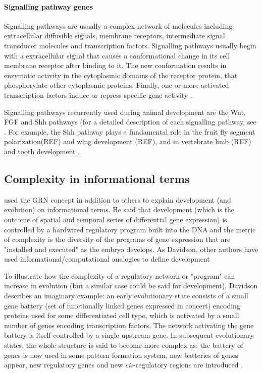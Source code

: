 \paragraph{Signalling pathway genes} Signalling pathways are usually a complex network of molecules including extracellular diffusible signals, membrane receptors, intermediate signal transducer molecules and transcription factors.
Signalling pathways usually begin with a extracellular signal that causes a conformational change in its cell membrane receptor after binding to it.
The new conformation results in enzymatic activity in the cytoplasmic domains of the receptor protein, that phosphorylate other cytoplasmic proteins.
Finally, one or more activated transcription factors induce or repress specific gene activity \citep{Gilbert2014}.

Signalling pathways recurrently used during animal development are the Wnt, FGF and Shh pathways (for a detailed description of each signalling pathway, see \citep{Gilbert2014}.
For example, the Shh pathway plays a fundamental role in the fruit fly segment polarization(REF) and wing development (REF), and in vertebrate limb (REF) and tooth development \citep{Jernvall2000b}.

\subsection{Complexity in informational terms}

\cite{Davidson2001} used the GRN concept in addition to others to explain development (and evolution) on informational terms. He said that development (which is the outcome of spatial and temporal series of differential gene expression) is controlled by a hardwired regulatory program built into the DNA and the metric of complexity is the diversity of the programs of gene expression that are "installed and executed" as the embryo develops. As Davidson, other authors have used informational/computational analogies to define development \citep{Apter1965,monod2012cytodifferentiation,mayr1997evolution} 

To illustrate how the complexity of a regulatory network or "program" can increase in evolution (but a similar case could be said for development), Davidson describes an imaginary example:
an early evolutionary state consists of a small gene battery (set of functionally linked genes expressed in concert) encoding proteins used for some differentiated cell type, which is activated by a small number of genes encoding transcription factors. The network activating the gene battery is itself controlled by a single upstream gene.
In subsequent evolutionary states, the whole structure is said to become more complex as: the battery of genes is now used in some pattern formation system, new batteries of genes appear, new regulatory genes and new \textit{cis}-regulatory regions are introduced  \citep{Davidson2001}.


